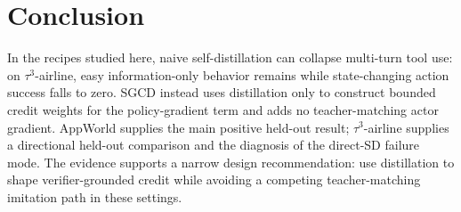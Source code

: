 \section{Conclusion}
\label{sec:conclusion}

In the recipes studied here, naive self-distillation can collapse multi-turn
tool use: on $\tau^3$-airline,
easy information-only behavior remains while state-changing action success falls
to zero. SGCD instead uses distillation only to construct bounded credit weights
for the policy-gradient term and adds no teacher-matching actor gradient. AppWorld supplies the main
positive held-out result; $\tau^3$-airline supplies a directional held-out
comparison and the diagnosis of the direct-SD failure mode. The evidence
supports a narrow design recommendation: use distillation to shape
verifier-grounded credit while avoiding a competing teacher-matching imitation
path in these settings.
